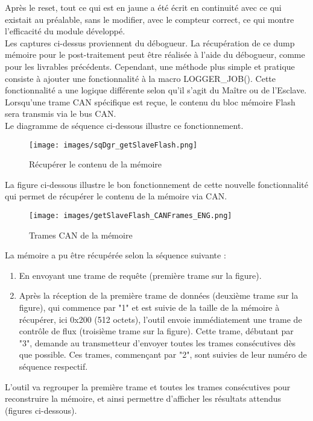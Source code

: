 \documentclass[a4paper, 12pt]{report}
\begin{document}
Après le reset, tout ce qui est en jaune a été écrit en continuité avec ce qui existait au préalable, sans le modifier, avec le compteur correct, ce qui montre l’efficacité du module développé.\\

    Les captures ci-dessus proviennent du débogueur. La récupération de ce dump mémoire pour le post-traitement peut être réalisée à l'aide du débogueur, comme pour les livrables précédents. Cependant, une méthode plus simple et pratique consiste à ajouter une fonctionnalité à la macro {\color{green}LOGGER\_JOB}(). Cette fonctionnalité a une logique différente selon qu'il s'agit du Maître ou de l'Esclave. Lorsqu'une trame CAN spécifique est reçue, le contenu du bloc mémoire Flash sera transmis via le bus CAN.\\



    Le diagramme de séquence ci-dessous illustre ce fonctionnement.

     \begin{figure}[H]
            \centering \texttt{[image: images/sqDgr\_getSlaveFlash.png]}
            \caption{Récupérer le contenu de la mémoire}
            \label{fig:getSlaveFlash}
    \end{figure}


    La figure ci-dessous illustre le bon fonctionnement de cette nouvelle fonctionnalité qui permet de récupérer le contenu de la mémoire via CAN.

    \begin{figure}[H]
            \centering \texttt{[image: images/getSlaveFlash\_CANFrames\_ENG.png]}
            \caption{Trames CAN de la mémoire}
            \label{fig:getSlaveFlash_CANFrames}
    \end{figure}

    La mémoire a pu être récupérée selon la séquence suivante : 
        \begin{enumerate}
        \item En envoyant une trame de requête (première trame sur la figure).
        \item Après la réception de la première trame de données (deuxième trame sur la figure), qui commence par "1" et est suivie de la taille de la mémoire à récupérer, ici 0x200 (512 octets), l'outil envoie immédiatement une trame de contrôle de flux (troisième trame sur la figure). Cette trame, débutant par "3", demande au transmetteur d'envoyer toutes les trames consécutives dès que possible. Ces trames, commençant par "2", sont suivies de leur numéro de séquence respectif.
    \end{enumerate}
\vspace*{0.5cm}
        L'outil va regrouper la première trame et toutes les trames consécutives pour reconstruire la mémoire, et ainsi permettre d'afficher les résultats attendus (figures ci-dessous).
\end{document}
